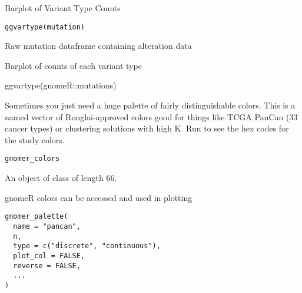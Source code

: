 \documentclass[a4paper]{book}
\begin{document}
%
\begin{Description}\relax
Barplot of Variant Type Counts
\end{Description}
%
\begin{Usage}
\begin{verbatim}
ggvartype(mutation)
\end{verbatim}
\end{Usage}
%
\begin{Arguments}
\begin{ldescription}
\item[\code{mutation}] Raw mutation dataframe containing alteration data
\end{ldescription}
\end{Arguments}
%
\begin{Value}
Barplot of counts of each variant type
\end{Value}
%
\begin{Examples}
\begin{ExampleCode}
ggvartype(gnomeR::mutations)

\end{ExampleCode}
\end{Examples}
%
\begin{Description}\relax
Sometimes you just need a huge palette of fairly distinguishable colors.
This is a named vector of Ronglai-approved colors good for things like TCGA PanCan (33 cancer types)
or clustering solutions with high K. Run  to
see the hex codes for the study colors.
\end{Description}
%
\begin{Usage}
\begin{verbatim}
gnomer_colors
\end{verbatim}
\end{Usage}
%
\begin{Format}
An object of class  of length 66.
\end{Format}
%
\begin{Description}\relax
gnomeR colors can be accessed and used in plotting
\end{Description}
%
\begin{Usage}
\begin{verbatim}
gnomer_palette(
  name = "pancan",
  n,
  type = c("discrete", "continuous"),
  plot_col = FALSE,
  reverse = FALSE,
  ...
)
\end{verbatim}
\end{Usage}
\end{document}
